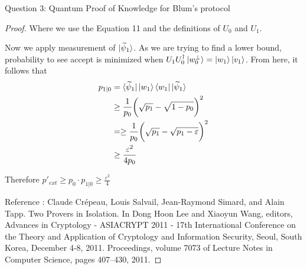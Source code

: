 \begin{solution}{Question 3: Quantum Proof of Knowledge for Blum’s protocol}
\begin{proof}
    Where we use the Equation 11 and the definitions of $U_0$ and $U_1$. \newline

    Now we apply measurement of $\ket{\widetilde{\psi}_1}$. As we are trying to find a lower bound, probability to see accept is minimized when $U_1U_0^\dag\ket{w_0^\perp} = \ket{w_1}\ket{v_1}$. From here, it follows that 
    \begin{equation*}
        \begin{split}
            p_{1|0} &=  \bra{\widetilde{\psi}_1}\ket{w_1}\bra{w_1}\ket{\widetilde{\psi}_1}\\
            &\geq\frac{1}{p_0}\bigg(\sqrt{p_1}-\sqrt{1-p_0}\bigg)^2\\
            &=\geq\frac{1}{p_0}\bigg(\sqrt{p_1}-\sqrt{p_1-\varepsilon}\bigg)^2\\
            &\geq \frac{\varepsilon^2}{4p_0}
        \end{split}
    \end{equation*}

    Therefore $p'_{ext}\geq p_0\cdot p_{1|0} \geq \frac{\varepsilon^2}{4}$\newline

Reference :  Claude Crépeau, Louis Salvail, Jean-Raymond Simard, and Alain Tapp. Two Provers in Isolation. In Dong Hoon Lee and Xiaoyun Wang, editors, Advances in Cryptology - ASIACRYPT 2011 - 17th International Conference on the Theory and Application of Cryptology and Information Security, Seoul, South Korea, December 4-8, 2011. Proceedings, volume 7073 of Lecture Notes in Computer Science, pages 407–430, 2011.

    





    
    \end{proof}
\end{solution}

